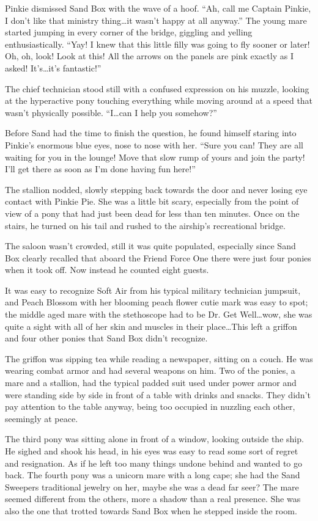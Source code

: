 Pinkie dismissed Sand Box with the wave of a hoof. ``Ah, call me Captain Pinkie, I don't like that ministry thing\dots it wasn't happy at all anyway.'' The young mare started jumping in every corner of the bridge, giggling and yelling enthusiastically. ``Yay! I knew that this little filly was going to fly sooner or later! Oh, oh, look! Look at this! All the arrows on the panels are pink exactly as I asked! It's\dots it's fantastic!''

The chief technician stood still with a confused expression on his muzzle, looking at the hyperactive pony touching everything while moving around at a speed that wasn't physically possible. ``I\dots can I help you somehow?''

Before Sand had the time to finish the question, he found himself staring into Pinkie's enormous blue eyes, nose to nose with her. ``Sure you can! They are all waiting for you in the lounge! Move that slow rump of yours and join the party! I'll get there as soon as I'm done having fun here!''

The stallion nodded, slowly stepping back towards the door and never losing eye contact with Pinkie Pie. She was a little bit scary, especially from the point of view of a pony that had just been dead for less than ten minutes. Once on the stairs, he turned on his tail and rushed to the airship's recreational bridge.

The saloon wasn't crowded, still it was quite populated, especially since Sand Box clearly recalled that aboard the Friend Force One there were just four ponies when it took off. Now instead he counted eight guests.

It was easy to recognize Soft Air from his typical military technician jumpsuit, and Peach Blossom with her blooming peach flower cutie mark was easy to spot; the middle aged mare with the stethoscope had to be Dr. Get Well\dots wow, she was quite a sight with all of her skin and muscles in their place\dots This left a griffon and four other ponies that Sand Box didn't recognize.

The griffon was sipping tea while reading a newspaper, sitting on a couch. He was wearing combat armor and had several weapons on him. Two of the ponies, a mare and a stallion, had the typical padded suit used under power armor and were standing side by side in front of a table with drinks and snacks. They didn't pay attention to the table anyway, being too occupied in nuzzling each other, seemingly at peace.

The third pony was sitting alone in front of a window, looking outside the ship. He sighed and shook his head, in his eyes was easy to read some sort of regret and resignation. As if he left too many things undone behind and wanted to go back. The fourth pony was a unicorn mare with a long cape; she had the Sand Sweepers traditional jewelry on her, maybe she was a dead far seer? The mare seemed different from the others, more a shadow than a real presence. She was also the one that trotted towards Sand Box when he stepped inside the room.

